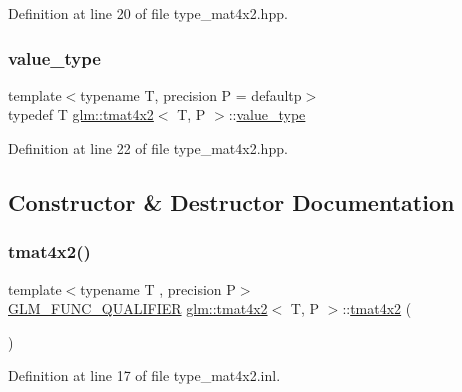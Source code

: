 Definition at line 20 of file type\+\_\+mat4x2.\+hpp.

\mbox{\label{structglm_1_1tmat4x2_a1a84490287435bbc6746b250e03169f5}} 
\subsubsection{\texorpdfstring{value\_type}{value\_type}}
{\footnotesize\ttfamily template$<$typename T, precision P = defaultp$>$ \\
typedef T \mbox{\hyperlink{structglm_1_1tmat4x2}{glm\+::tmat4x2}}$<$ T, P $>$\+::\mbox{\hyperlink{structglm_1_1tmat4x2_a1a84490287435bbc6746b250e03169f5}{value\+\_\+type}}}



Definition at line 22 of file type\+\_\+mat4x2.\+hpp.



\subsection{Constructor \& Destructor Documentation}
\mbox{\label{structglm_1_1tmat4x2_a1d2457515fa1ebc93f7226f9285f0d91}} 
\subsubsection{\texorpdfstring{tmat4x2()}{tmat4x2()}\hspace{0.1cm}{\footnotesize\ttfamily [1/22]}}
{\footnotesize\ttfamily template$<$typename T , precision P$>$ \\
\mbox{\hyperlink{setup_8hpp_a33fdea6f91c5f834105f7415e2a64407}{G\+L\+M\+\_\+\+F\+U\+N\+C\+\_\+\+Q\+U\+A\+L\+I\+F\+I\+ER}} \mbox{\hyperlink{structglm_1_1tmat4x2}{glm\+::tmat4x2}}$<$ T, P $>$\+::\mbox{\hyperlink{structglm_1_1tmat4x2}{tmat4x2}} (\begin{DoxyParamCaption}{ }\end{DoxyParamCaption})}



Definition at line 17 of file type\+\_\+mat4x2.\+inl.

\mbox{\label{structglm_1_1tmat4x2_a8573e7d7acf01aa378eee49f7e9c580a}} 
